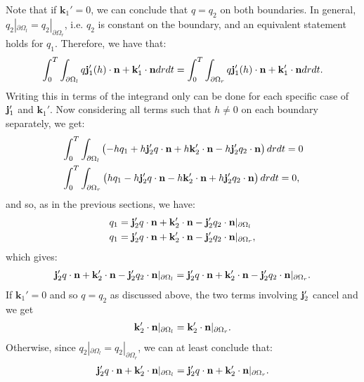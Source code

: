 	Note that if $\mathbf{k}_1' = 0$, we can conclude that $q = q_2$ on both boundaries.
	In general, $q_2|_{\partial \Omega_l} = q_2|_{\partial \Omega_r}$, i.e. $q_2$ is constant on the boundary, and an equivalent statement holds for $q_1$. Therefore, we have that:
	\begin{align*}
		\int_0^T \int_{\partial \Omega_l}  q \mathbf j_1'(h)   \cdot \mathbf{n}  +\mathbf{k}_1' \cdot \mathbf{n}   dr dt = \int_0^T \int_{\partial \Omega_r} q \mathbf j_1'(h)   \cdot \mathbf{n}  +  \mathbf{k}_1' \cdot \mathbf{n}  dr dt .
	\end{align*}
	Writing this in terms of the integrand only can be done for each specific case of $\mathbf j_1'$ and $\mathbf{k}_1'$. 
	 Now considering all terms such that $h \neq 0$ on each boundary separately, we get:
	 \begin{align*}
	 	&\int_0^T \int_{\partial \Omega_l} \left(- h q_1  + h \mathbf j'_2 q \cdot \mathbf{n} + h\mathbf{k}_2' \cdot \mathbf{n}-  h \mathbf j'_2 q_2 \cdot \mathbf{n} \right)   dr  dt =0 \\
	 	&\int_0^T \int_{\partial \Omega_r} \left( h q_1  - h \mathbf j'_2 q \cdot \mathbf{n} - h\mathbf{k}_2' \cdot \mathbf{n} + h \mathbf j'_2 q_2 \cdot \mathbf{n} \right)   dr  dt =0 ,
	 \end{align*}
 	and so, as in the previous sections, we have:
 	\begin{align*}
 		q_1 &=   \mathbf j'_2 q \cdot \mathbf{n} + \mathbf{k}_2' \cdot \mathbf{n} - \mathbf j'_2 q_2 \cdot \mathbf{n} |_{\partial \Omega_l} \\
		q_1 &=  \mathbf j'_2 q \cdot \mathbf{n} + \mathbf{k}_2' \cdot \mathbf{n} -\mathbf j'_2 q_2 \cdot \mathbf{n} |_{\partial \Omega_r}, 
 	\end{align*}
	which gives:
	\begin{align*}
		  \mathbf j'_2 q \cdot \mathbf{n} +  \mathbf{k}_2' \cdot \mathbf{n} - \mathbf j'_2 q_2 \cdot \mathbf{n} |_{\partial \Omega_l} =  \mathbf j'_2 q \cdot \mathbf{n} + \mathbf{k}_2' \cdot \mathbf{n} - \mathbf j'_2 q_2 \cdot \mathbf{n} |_{\partial \Omega_r}.
	\end{align*}
	If $\mathbf{k}_1' = 0$ and so $q = q_2$ as discussed above, the two terms involving $\mathbf j_2'$ cancel and we get
	\begin{align*}
	 \mathbf{k}_2' \cdot \mathbf{n}  |_{\partial \Omega_l} =   \mathbf{k}_2' \cdot \mathbf{n}  |_{\partial \Omega_r}.
	\end{align*}
	Otherwise, since $q_2|_{\partial \Omega_l} = q_2|_{\partial \Omega_r}$, we can at least conclude that:
	\begin{align*}
		\mathbf j'_2 q \cdot \mathbf{n} + \mathbf{k}_2' \cdot \mathbf{n}  |_{\partial \Omega_l} =  \mathbf j'_2 q \cdot \mathbf{n} + \mathbf{k}_2' \cdot \mathbf{n}  |_{\partial \Omega_r}.
	\end{align*}
	\\
